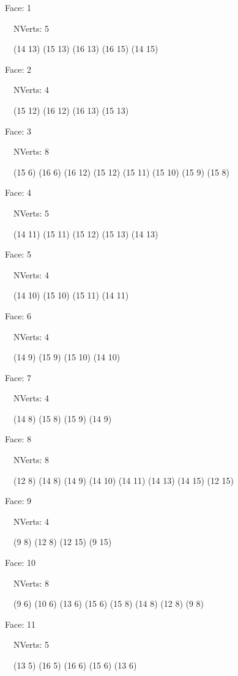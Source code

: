 \documentclass{article}
\begin{document}
{\footnotesize 

Face: 1

\   \    NVerts: 5

 \   \   (14 13) (15 13) (16 13) (16 15) (14 15)}

{\footnotesize 

Face: 2

\   \    NVerts: 4

 \   \   (15 12) (16 12) (16 13) (15 13)}

{\footnotesize 

Face: 3

\   \    NVerts: 8

 \   \   (15 6) (16 6) (16 12) (15 12) (15 11) (15 10) (15 9) (15 8)}

{\footnotesize 

Face: 4

\   \    NVerts: 5

 \   \   (14 11) (15 11) (15 12) (15 13) (14 13)}

{\footnotesize 

Face: 5

\   \    NVerts: 4

 \   \   (14 10) (15 10) (15 11) (14 11)}

{\footnotesize 

Face: 6

\   \    NVerts: 4

 \   \   (14 9) (15 9) (15 10) (14 10)}

{\footnotesize 

Face: 7

\   \    NVerts: 4

 \   \   (14 8) (15 8) (15 9) (14 9)}

{\footnotesize 

Face: 8

\   \    NVerts: 8

 \   \   (12 8) (14 8) (14 9) (14 10) (14 11) (14 13) (14 15) (12 15)}

{\footnotesize 

Face: 9

\   \    NVerts: 4

 \   \   (9 8) (12 8) (12 15) (9 15)}

{\footnotesize 

Face: 10

\   \    NVerts: 8

 \   \   (9 6) (10 6) (13 6) (15 6) (15 8) (14 8) (12 8) (9 8)}

{\footnotesize 

Face: 11

\   \    NVerts: 5

 \   \   (13 5) (16 5) (16 6) (15 6) (13 6)}
\end{document}
